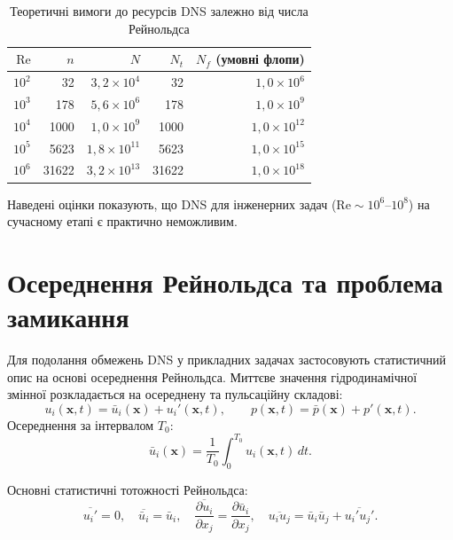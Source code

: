 \documentclass[14pt,a4paper,extarticle]{extarticle}
\newcommand{\Rey}{\mathrm{Re}}
\begin{document}
\begin{table}[H]
  \caption{Теоретичні вимоги до ресурсів DNS залежно від числа Рейнольдса}
  \label{tab:dns}
  \centering
  \renewcommand{\arraystretch}{1.2}
  \begin{tabular}{|r|r|r|r|r|}
    \hline
    $\Rey$ & $n$ & $N$ & $N_t$ & $N_f$ (умовні флопи) \\
    \hline
    $10^2$   & 32    & $3{,}2 \times 10^4$   & 32    & $1{,}0 \times 10^6$ \\
    \hline
    $10^3$   & 178   & $5{,}6 \times 10^6$   & 178   & $1{,}0 \times 10^9$ \\
    \hline
    $10^4$   & 1000  & $1{,}0 \times 10^9$   & 1000  & $1{,}0 \times 10^{12}$ \\
    \hline
    $10^5$   & 5623  & $1{,}8 \times 10^{11}$ & 5623  & $1{,}0 \times 10^{15}$ \\
    \hline
    $10^6$   & 31622 & $3{,}2 \times 10^{13}$ & 31622 & $1{,}0 \times 10^{18}$ \\
    \hline
  \end{tabular}
\end{table}

Наведені оцінки показують, що DNS для інженерних задач ($\Rey \sim 10^6$--$10^8$)
на сучасному етапі є практично неможливим.

\section{Осереднення Рейнольдса та проблема замикання}

Для подолання обмежень DNS у прикладних задачах застосовують статистичний
опис на основі осереднення Рейнольдса. Миттєве значення гідродинамічної
змінної розкладається на осереднену та пульсаційну складові:
\begin{equation}
  u_i(\mathbf{x}, t) = \bar{u}_i(\mathbf{x}) + u_i'(\mathbf{x}, t),
  \qquad
  p(\mathbf{x}, t) = \bar{p}(\mathbf{x}) + p'(\mathbf{x}, t).
  \label{eq:reynolds-decomp}
\end{equation}
Осереднення за інтервалом $T_0$:
\begin{equation}
  \bar{u}_i(\mathbf{x}) = \frac{1}{T_0} \int_{0}^{T_0} u_i(\mathbf{x}, t)\, dt.
  \label{eq:time-avg}
\end{equation}

Основні статистичні тотожності Рейнольдса:
\begin{equation}
  \overline{u_i'} = 0,\quad
  \overline{\bar{u}_i} = \bar{u}_i,\quad
  \overline{\frac{\partial u_i}{\partial x_j}} = \frac{\partial \bar{u}_i}{\partial x_j},\quad
  \overline{u_i u_j} = \bar{u}_i \bar{u}_j + \overline{u_i' u_j'}.
  \label{eq:reynolds-identities}
\end{equation}
\end{document}
